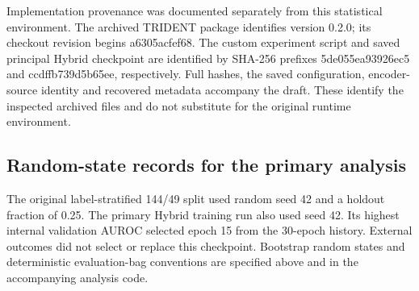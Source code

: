 Implementation provenance was documented separately from this statistical environment. The archived TRIDENT package identifies version 0.2.0; its checkout revision begins a6305acfef68. The custom experiment script and saved principal Hybrid checkpoint are identified by SHA-256 prefixes 5de055ea93926ec5 and ccdffb739d5b65ee, respectively. Full hashes, the saved configuration, encoder-source identity and recovered metadata accompany the draft. These identify the inspected archived files and do not substitute for the original runtime environment. 

\subsection{Random-state records for the primary analysis}

The original label-stratified 144/49 split used random seed 42 and a holdout fraction of 0.25. The primary Hybrid training run also used seed 42. Its highest internal validation AUROC selected epoch 15 from the 30-epoch history. External outcomes did not select or replace this checkpoint. Bootstrap random states and deterministic evaluation-bag conventions are specified above and in the accompanying analysis code.
